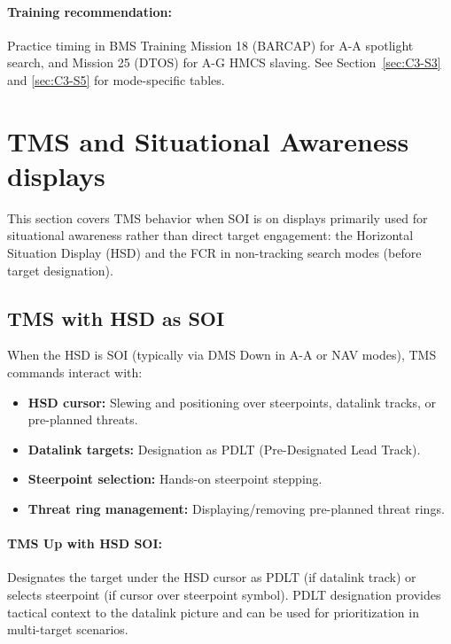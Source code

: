 \documentclass[11pt, a4paper, twoside]{report}
\begin{document}
\paragraph{Training recommendation:}
Practice timing in BMS Training Mission 18 (BARCAP) for A-A spotlight search, and Mission 25 (DTOS) for A-G HMCS slaving. See Section~\ref{sec:C3-S3} and \ref{sec:C3-S5} for mode-specific tables.

\newpage
\section{TMS and Situational Awareness displays}
\label{sec:C3-S2}

This section covers TMS behavior when SOI is on displays primarily used for situational awareness rather than direct target engagement: the Horizontal Situation Display (HSD) and the FCR in non-tracking search modes (before target designation).

\subsection{TMS with HSD as SOI}
\label{sec:C3-S2-S1}

When the HSD is SOI (typically via DMS Down in A-A or NAV modes), TMS commands interact with:
\begin{itemize}
    \item \textbf{HSD cursor:} Slewing and positioning over steerpoints, datalink tracks, or pre-planned threats.
    \item \textbf{Datalink targets:} Designation as PDLT (Pre-Designated Lead Track).
    \item \textbf{Steerpoint selection:} Hands-on steerpoint stepping.
    \item \textbf{Threat ring management:} Displaying/removing pre-planned threat rings.
\end{itemize}

\paragraph{TMS Up with HSD SOI:}
Designates the target under the HSD cursor as PDLT (if datalink track) or selects steerpoint (if cursor over steerpoint symbol). PDLT designation provides tactical context to the datalink picture and can be used for prioritization in multi-target scenarios.
\end{document}
